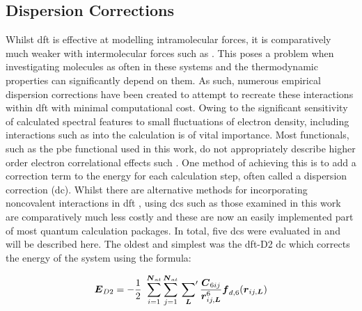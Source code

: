 \subsection{Dispersion Corrections}
\label{subsec:dcs}
Whilst \acrshort{dft} is effective at modelling intramolecular forces, it is comparatively much weaker with intermolecular forces such as \DIFdelbegin {}\DIFdelend \DIFaddbegin {}\nobreakdash{}\DIFaddend \cite{Kristyan2004}. This poses a problem when investigating \DIFdelbegin {}\DIFdelend \DIFaddbegin {}\DIFaddend molecules as often \DIFdelbegin {}\DIFdelend \DIFaddbegin {}\nobreakdash{}\DIFaddend in these systems and the thermodynamic properties can significantly depend on them. As such, numerous empirical dispersion corrections have been created to attempt to recreate these interactions within \acrshort{dft} with minimal computational cost. Owing to the significant sensitivity of calculated spectral features to small fluctuations of electron density, including interactions such as \DIFdelbegin {}\DIFdelend \DIFaddbegin {}\nobreakdash{}\DIFaddend into the calculation is of vital importance. Most functionals, such as the \acrshort{pbe} functional used in this work, do not \DIFdelbegin {}\DIFdelend appropriately describe higher order electron correlational effects such \DIFdelbegin {}\DIFdelend \DIFaddbegin {}\DIFaddend . One method of achieving this is to add a correction term to the energy for each calculation step, often called a dispersion correction (\acrshort{dc}). Whilst there are alternative methods for incorporating noncovalent interactions in \acrshort{dft} \DIFdelbegin \DIFdel{~}\DIFdelend \cite{Kozuch2010}, using \acrshort{dc}s such as those examined in this work are comparatively much less costly and these are now an easily implemented part of most quantum calculation packages.
In total, five \acrshort{dc}s were evaluated in  and will be described here. The oldest and simplest was the \acrshort{dft}-D2 \DIFdelbegin \DIFdel{~}\DIFdelend \cite{Grimme2006} \acrshort{dc} which corrects the energy of the system using the formula:

\begin{equation}
\boldsymbol{E}_{D2} = -\frac{1}{2}\ \sum_{i=1}^{\boldsymbol{N}_{at}} \sum_{j=1}^{\boldsymbol{N}_{at}} \sideset{}{'}\sum_{\boldsymbol{L}} \frac{\boldsymbol{C}_{6ij}}{\boldsymbol{r}_{ij,\boldsymbol{L}}^6} \boldsymbol{f}_{d,6}(\boldsymbol{r}_{ij, \boldsymbol{L}}) 
\end{equation}

